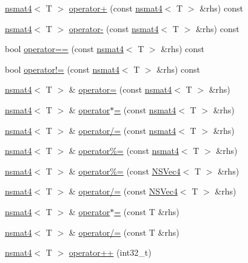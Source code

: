 \begin{DoxyCompactItemize}
\item 
\hyperlink{structnsmat4}{nsmat4}$<$ T $>$ \hyperlink{structnsmat4_ae66c9c7eaff824a951c255aa653781f2}{operator+} (const \hyperlink{structnsmat4}{nsmat4}$<$ T $>$ \&rhs) const 
\item 
\hyperlink{structnsmat4}{nsmat4}$<$ T $>$ \hyperlink{structnsmat4_a3ff51929b747889cd0fd26a2b906f033}{operator-\/} (const \hyperlink{structnsmat4}{nsmat4}$<$ T $>$ \&rhs) const 
\item 
bool \hyperlink{structnsmat4_ab45158880de26e91dab9f6ff777c60fe}{operator==} (const \hyperlink{structnsmat4}{nsmat4}$<$ T $>$ \&rhs) const 
\item 
bool \hyperlink{structnsmat4_aac003e75d4c1c6b15a3996508cbf04fc}{operator!=} (const \hyperlink{structnsmat4}{nsmat4}$<$ T $>$ \&rhs) const 
\item 
\hyperlink{structnsmat4}{nsmat4}$<$ T $>$ \& \hyperlink{structnsmat4_a853c9c35d4ab26892c5328dd4d8423c9}{operator=} (const \hyperlink{structnsmat4}{nsmat4}$<$ T $>$ \&rhs)
\item 
\hyperlink{structnsmat4}{nsmat4}$<$ T $>$ \& \hyperlink{structnsmat4_a6fdefdd98afc08e013e53bb05dbf62de}{operator$\ast$=} (const \hyperlink{structnsmat4}{nsmat4}$<$ T $>$ \&rhs)
\item 
\hyperlink{structnsmat4}{nsmat4}$<$ T $>$ \& \hyperlink{structnsmat4_aafe6f30856ca0e27e2978c9a75fd4d9e}{operator/=} (const \hyperlink{structnsmat4}{nsmat4}$<$ T $>$ \&rhs)
\item 
\hyperlink{structnsmat4}{nsmat4}$<$ T $>$ \& \hyperlink{structnsmat4_af0953298e638855c93c698858a3f4c2a}{operator\%=} (const \hyperlink{structnsmat4}{nsmat4}$<$ T $>$ \&rhs)
\item 
\hyperlink{structnsmat4}{nsmat4}$<$ T $>$ \& \hyperlink{structnsmat4_a224d3cba671a0da2c8a195f03246116e}{operator\%=} (const \hyperlink{structNSVec4}{N\-S\-Vec4}$<$ T $>$ \&rhs)
\item 
\hyperlink{structnsmat4}{nsmat4}$<$ T $>$ \& \hyperlink{structnsmat4_a4db8a8d627d3823293fa92511af4e673}{operator/=} (const \hyperlink{structNSVec4}{N\-S\-Vec4}$<$ T $>$ \&rhs)
\item 
\hyperlink{structnsmat4}{nsmat4}$<$ T $>$ \& \hyperlink{structnsmat4_a95e928e2783139bf41bb1e6983ed4563}{operator$\ast$=} (const T \&rhs)
\item 
\hyperlink{structnsmat4}{nsmat4}$<$ T $>$ \& \hyperlink{structnsmat4_af64ec545814796b70bc724132f2f6bb5}{operator/=} (const T \&rhs)
\item 
\hyperlink{structnsmat4}{nsmat4}$<$ T $>$ \hyperlink{structnsmat4_a5e1904ce0fbca1d905725ab167cbb340}{operator++} (int32\-\_\-t)

\end{DoxyCompactItemize}
